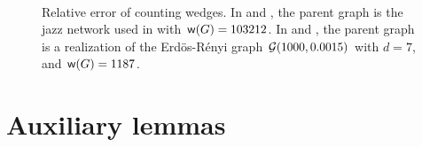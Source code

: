 \begin{figure}[H]
	~~
\caption{Relative error of counting wedges. In  and , the parent graph is the jazz network used in  with $ {\mathsf{w}}(G) = 103212 $. In  and , the parent graph is a realization of the Erd\"os-R\'enyi graph $ {\mathcal{G}}(1000, 0.0015) $ with $ d = 7 $, and $ {\mathsf{w}}(G) = 1187 $.}
\label{fig:wedge}
\end{figure}

	
\section{Auxiliary lemmas}\label{app:appendix}


